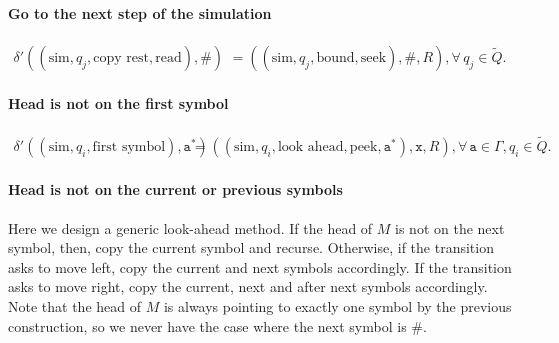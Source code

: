 \documentclass{article}
\newcommand{\obullet}[1]{\ensuremath{#1^*}}
\newcommand{\0}{\texttt{\textvisiblespace}}
\newcommand{\°}{\obullet{\0}}
\newcommand{\A}{\obullet{\s}}
\newcommand{\s}{\texttt{a}}
\newcommand{\X}{\texttt{x}}
\newcommand{\e}{\texttt{\#}}
\newcommand{\qwar}{\tilde{Q}}
\begin{document}
\paragraph{Go to the next step of the simulation}
\begin{align}
  \delta'((\text{sim}, q_j, \text{copy rest}, \text{read}), \e)
  &= ((\text{sim}, q_j, \text{bound}, \text{seek}), \e, R),
  \forall\,
  q_j \in \qwar.
\end{align}

\paragraph{Head is not on the first symbol}
\begin{align}
  \delta'((\text{sim}, q_i, \text{first symbol}),\A)
  &=((\text{sim}, q_i, \text{look ahead}, \text{peek}, \A), \X, R),
  \forall\,
  \s \in \Gamma,
  q_i \in \qwar.
\end{align}


\paragraph{Head is not on the current or previous symbols}
Here we design a generic look-ahead method. If the head of $M$ is not on the next
symbol, then, copy the current symbol and recurse. Otherwise, if the transition
asks to move left, copy the current and next symbols accordingly. If the
transition asks to move right, copy the current, next and after next symbols
accordingly. Note that the head of $M$ is always pointing to exactly one symbol
by the previous construction, so we never have the case where the next symbol
is $\e$.
\end{document}
